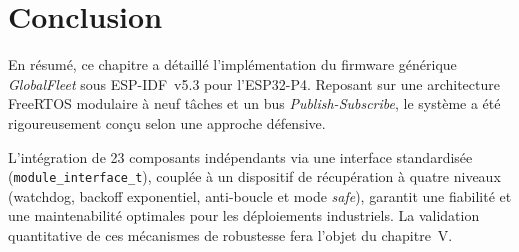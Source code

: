 \section{Conclusion}
\label{sec:conclu_ch4}
En résumé, ce chapitre a détaillé l'implémentation du firmware générique \textit{GlobalFleet} sous ESP-IDF~v5.3 pour l'ESP32-P4. Reposant sur une architecture FreeRTOS modulaire à neuf tâches et un bus \textit{Publish-Subscribe}, le système a été rigoureusement conçu selon une approche défensive. 

L'intégration de 23 composants indépendants via une interface standardisée (\texttt{module\_interface\_t}), couplée à un dispositif de récupération à quatre niveaux (watchdog, backoff exponentiel, anti-boucle et mode \textit{safe}), garantit une fiabilité et une maintenabilité optimales pour les déploiements industriels. La validation quantitative de ces mécanismes de robustesse fera l'objet du chapitre~V.